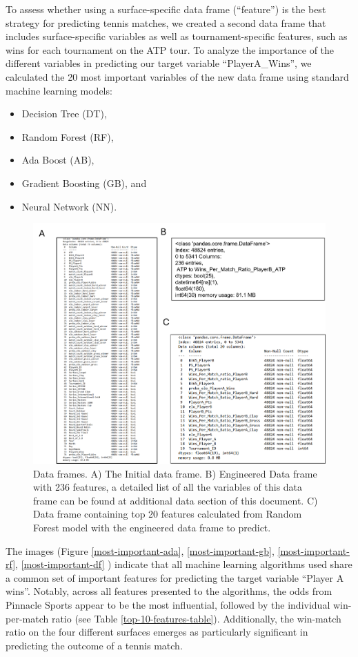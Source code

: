 \documentclass[preprint,aps,nofootinbib,a4paper,superscriptaddress,longbibliography,amsfonts,amssymb,amsmath,titlepage]{revtex4-2}
\begin{document}
To assess whether using a surface-specific data frame (``feature'') is the best strategy for predicting tennis matches, we created a second data frame that includes surface-specific variables as well as tournament-specific features, such as wins for each tournament on the ATP tour. To analyze the importance of the different variables in predicting our target variable ``PlayerA\_Wins'', we calculated the 20 most important variables of the new data frame using standard machine learning models:
%
\begin{itemize}
\item Decision Tree (DT),
\item Random Forest (RF),
\item Ada Boost (AB),
\item Gradient Boosting (GB), and
\item Neural Network (NN).
\end{itemize}

\begin{figure}[h]
\includegraphics[width=\textwidth]{pictures/dataframes-patrick.png}
\caption{Data frames. A)  The Initial data frame. B) Engineered Data frame with 236 features, a detailed list of all the variables of this data frame can be found at additional data section of this document. C) Data frame containing top 20 features calculated from Random Forest model with the engineered data frame to predict.}
\label{dataframes-patrick}
\end{figure}
%

The images (Figure \ref{most-important-ada}, \ref{most-important-gb}, \ref{most-important-rf}, \ref{most-important-df} ) indicate that all machine learning algorithms used share a common set of important features for predicting the target variable ``Player A wins''. Notably, across all features presented to the algorithms, the odds from Pinnacle Sports appear to be the most influential, followed by the individual win-per-match ratio (see Table \ref{top-10-features-table}). Additionally, the win-match ratio on the four different surfaces emerges as particularly significant in predicting the outcome of a tennis match.
\end{document}
